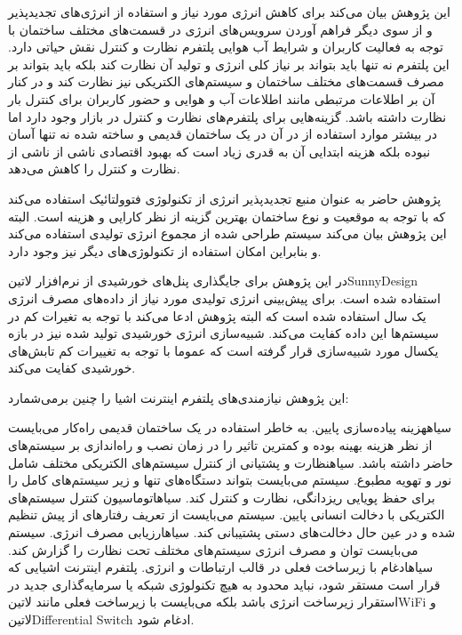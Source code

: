 این پژوهش بیان می‌کند برای کاهش انرژی مورد نیاز و استفاده از انرژی‌های تجدیدپذیر و از سوی دیگر فراهم آوردن سرویس‌های انرژی در قسمت‌های مختلف ساختمان با توجه به فعالیت
کاربران و شرایط آب هوایی پلتفرم نظارت و کنترل نقش حیاتی دارد. این پلتفرم نه تنها باید بتواند بر نیاز کلی انرژی و تولید آن نظارت کند بلکه باید بتواند بر مصرف قسمت‌های مختلف ساختمان
و سیستم‌های الکتریکی نیز نظارت کند و در کنار آن بر اطلاعات مرتبطی مانند اطلاعات آب و هوایی و حضور کاربران برای کنترل بار نظارت داشته باشد.
گزینه‌هایی برای پلتفرم‌های نظارت و کنترل در بازار وجود دارد اما در بیشتر موارد استفاده از در آن در یک ساختمان قدیمی و ساخته شده نه تنها آسان نبوده بلکه هزینه ابتدایی آن به قدری زیاد است
که بهبود اقتصادی ناشی از ناشی از نظارت و کنترل را کاهش می‌دهد.

پژوهش حاضر به عنوان منبع تجدید‌پذیر انرژی از تکنولوژی فتوولتائیک استفاده می‌کند که با توجه به موقعیت و نوع ساختمان بهترین گزینه از نظر کارایی و هزینه است.
البته این پژوهش بیان می‌کند سیستم طراحی شده از مجموع انرژی تولیدی استفاده می‌کند و بنابراین امکان استفاده از تکنولوژی‌های دیگر نیز وجود دارد.

در این پژوهش برای جایگذاری پنل‌های خورشیدی از نرم‌افزار ‌لاتین{SunnyDesign} استفاده شده است. برای پیش‌بینی انرژی تولیدی مورد نیاز از داده‌های مصرف
انرژی یک سال استفاده شده است که البته پژوهش ادعا می‌کند با توجه به تغیرات کم در سیستم‌ها این داده کفایت می‌کند. شبیه‌سازی انرژی خورشیدی تولید شده نیز
در بازه یکسال مورد شبیه‌سازی قرار گرفته است که عموما با توجه به تغییرات کم تابش‌های خورشیدی کفایت می‌کند.

این پژوهش نیازمندی‌های پلتفرم اینترنت اشیا را چنین برمی‌شمارد:

 ‌سیاه{هزینه پیاده‌سازی پایین}. به خاطر استفاده در یک ساختمان قدیمی راه‌کار می‌بایست از نظر هزینه بهینه بوده و کمترین تاثیر را در زمان نصب و راه‌اندازی
بر سیستم‌های حاضر داشته باشد.
 ‌سیاه{نظارت و پشتیانی از کنترل سیستم‌های الکتریکی مختلف شامل نور و تهویه مطبوع}. سیستم می‌بایست بتواند دستگاه‌های تنها
و زیر سیستم‌های کامل را برای حفظ پویایی ریزدانگی، نظارت و کنترل کند.
 ‌سیاه{اتوماسیون کنترل سیستم‌های الکتریکی با دخالت انسانی پایین}. سیستم می‌بایست از تعریف رفتارهای از پیش تنظیم شده و در عین حال دخالت‌های دستی
پشتیبانی کند.
 ‌سیاه{ارزیابی مصرف انرژی}. سیستم می‌بایست توان و مصرف انرژی سیستم‌های مختلف تحت نظارت را گزارش کند.
 ‌سیاه{ادغام با زیرساخت فعلی در قالب ارتباطات و انرژی}. پلتفرم اینترنت اشیایی که قرار است مستقر شود، نباید محدود به هیچ تکنولوژی شبکه یا سرمایه‌گذاری
جدید در استقرار زیرساخت انرژی باشد بلکه می‌بایست با زیرساخت فعلی مانند ‌لاتین{WiFi} و ‌لاتین{Differential Switch} ادغام شود.

